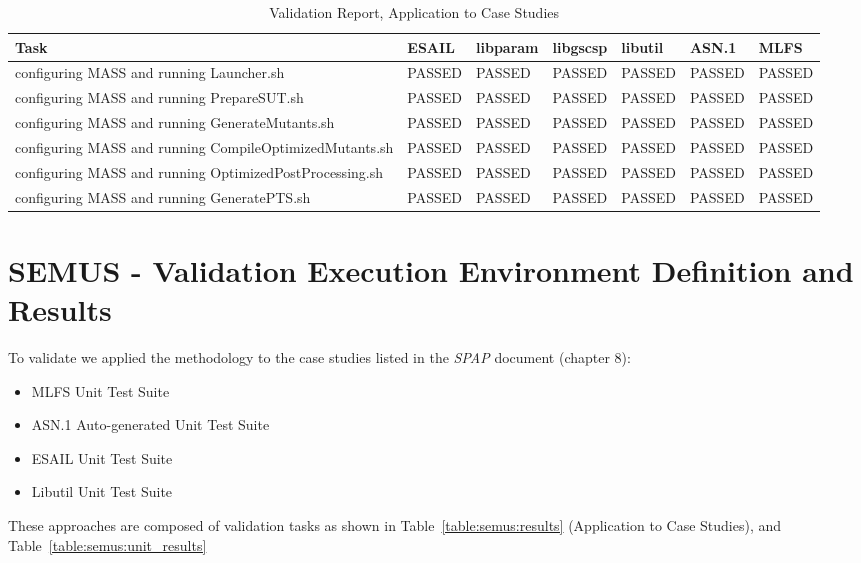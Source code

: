 \begin{table}[h]
\caption{\MASS Validation Report, Application to Case Studies}
\label{table:mass:results}
\scriptsize
\centering
\begin{tabular}{|l|l|l|l|l|l|l|}
\hline
\textbf{Task}&\textbf{ESAIL}&\textbf{libparam} &\textbf{libgscsp}&\textbf{libutil}&\textbf{ASN.1}&\textbf{MLFS}\\
\hline
configuring MASS and running Launcher.sh&PASSED&PASSED&PASSED&PASSED&PASSED&PASSED\\
configuring MASS and running PrepareSUT.sh&PASSED&PASSED&PASSED&PASSED&PASSED&PASSED\\
configuring MASS and running GenerateMutants.sh&PASSED&PASSED&PASSED&PASSED&PASSED&PASSED\\
configuring MASS and running CompileOptimizedMutants.sh&PASSED&PASSED&PASSED&PASSED&PASSED&PASSED\\
configuring MASS and running OptimizedPostProcessing.sh&PASSED&PASSED&PASSED&PASSED&PASSED&PASSED\\
configuring MASS and running GeneratePTS.sh &PASSED&PASSED&PASSED&PASSED&PASSED&PASSED\\
\hline
\end{tabular}

\end{table}



\chapter{SEMUS - Validation Execution Environment Definition and Results}

To validate \SEMUS we applied the methodology to the case studies listed in the \emph{SPAP} document (chapter 8):
\begin{itemize}
  \item MLFS Unit Test Suite
  \item ASN.1 Auto-generated Unit Test Suite
  \item ESAIL Unit Test Suite
  \item Libutil Unit Test Suite
\end{itemize}

These approaches are composed of validation tasks as shown in Table~\ref{table:semus:results} (Application to Case Studies), and Table~\ref{table:semus:unit_results}


